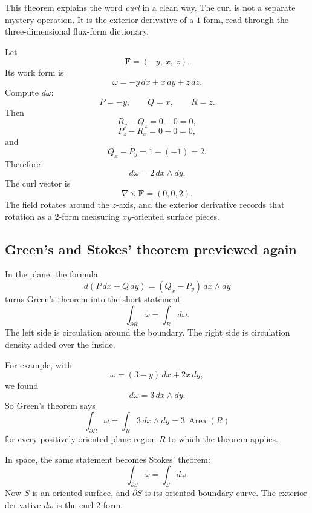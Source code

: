 This theorem explains the word \emph{curl} in a clean way.  The curl is not a separate
mystery operation.  It is the exterior derivative of a \(1\)-form, read through the
three-dimensional flux-form dictionary.

\begin{example}
Let
\[
    \mathbf F=(-y,\ x,\ z).
\]
Its work form is
\[
    \omega=-y\,dx+x\,dy+z\,dz.
\]
Compute \(d\omega\):
\[
    P=-y,\qquad Q=x,\qquad R=z.
\]
Then
\[
    R_y-Q_z=0-0=0,
\]
\[
    P_z-R_x=0-0=0,
\]
and
\[
    Q_x-P_y=1-(-1)=2.
\]
Therefore
\[
\boxed{
    d\omega=2\,dx\wedge dy.
}
\]
The curl vector is
\[
    \nabla\times\mathbf F=(0,0,2).
\]
The field rotates around the \(z\)-axis, and the exterior derivative records that
rotation as a \(2\)-form measuring \(xy\)-oriented surface pieces.
\end{example}

\subsection{Green's and Stokes' theorem previewed again}

In the plane, the formula
\[
    d(P\,dx+Q\,dy)=(Q_x-P_y)\,dx\wedge dy
\]
turns Green's theorem into the short statement
\[
\boxed{
    \int_{\partial R}\omega=\int_R d\omega.
}
\]
The left side is circulation around the boundary.  The right side is circulation density
added over the inside.

For example, with
\[
    \omega=(3-y)\,dx+2x\,dy,
\]
we found
\[
    d\omega=3\,dx\wedge dy.
\]
So Green's theorem says
\[
\boxed{
    \int_{\partial R}\omega
    =
    \int_R 3\,dx\wedge dy
    =
    3\,\operatorname{Area}(R)
}
\]
for every positively oriented plane region \(R\) to which the theorem applies.

In space, the same statement becomes Stokes' theorem:
\[
\boxed{
    \int_{\partial S}\omega=\int_S d\omega.
}
\]
Now \(S\) is an oriented surface, and \(\partial S\) is its oriented boundary curve.
The exterior derivative \(d\omega\) is the curl \(2\)-form.

